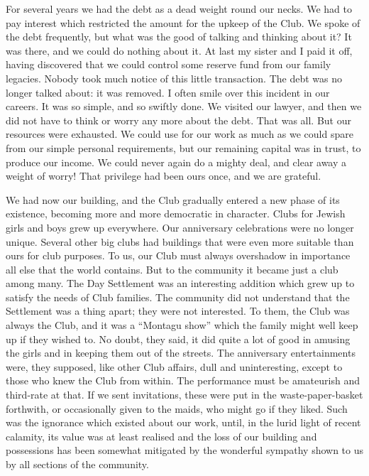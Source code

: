 For several years we had the debt as a dead weight
round our necks. We had to pay interest which restricted
the amount for the upkeep of the Club. We spoke of the
debt frequently, but what was the good of talking and
thinking about it? It was there, and we could do nothing
about it. At last my sister and I paid it off, having discovered
that we could control some reserve fund from our
family legacies. Nobody took much notice of this little
transaction. The debt was no longer talked about: it
was removed. I often smile over this incident in our
careers. It was so simple, and so swiftly done. We visited
our lawyer, and then we did not have to think or worry
any more about the debt. That was all. But our resources
were exhausted. We could use for our work as
much as we could spare from our simple personal requirements,
but our remaining capital was in trust, to produce
our income. We could never again do a mighty deal, and
clear away a weight of worry! That privilege had been
ours once, and we are grateful.

We had now our building, and the Club gradually
entered a new phase of its existence, becoming more and
more democratic in character. Clubs for Jewish girls
and boys grew up everywhere. Our anniversary celebrations
were no longer unique. Several other big clubs had
buildings that were even more suitable than ours for club
purposes. To us, our Club must always overshadow in
importance all else that the world contains. But to the
community it became just a club among many. The Day
Settlement was an interesting addition which grew up to
satisfy the needs of Club families. The community did
not understand that the Settlement was a thing apart;
they were not interested. To them, the Club was always
the Club, and it was a “Montagu show” which the
family might well keep up if they wished to. No doubt,
they said, it did quite a lot of good in amusing the girls
and in keeping them out of the streets. The anniversary
entertainments were, they supposed, like other Club
affairs, dull and uninteresting, except to those who
knew the Club from within. The performance must be
amateurish and third-rate at that. If we sent invitations,
these were put in the waste-paper-basket forthwith, or
occasionally given to the maids, who might go if they
liked. Such was the ignorance which existed about our
work, until, in the lurid light of recent calamity, its value
was at least realised and the loss of our building and
possessions has been somewhat mitigated by the wonderful
sympathy shown to us by all sections of the community.

